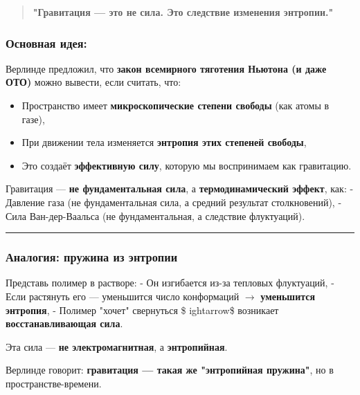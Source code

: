 \documentclass[11pt]{article}
\providecommand{\tightlist}{%
      \setlength{\itemsep}{0pt}\setlength{\parskip}{0pt}}
\begin{document}
\begin{quote}
\textbf{"Гравитация --- это не сила. Это следствие изменения энтропии."}
\end{quote}

\subsubsection{Основная
идея:}\label{ux43eux441ux43dux43eux432ux43dux430ux44f-ux438ux434ux435ux44f-1}

Верлинде предложил, что \textbf{закон всемирного тяготения Ньютона (и
даже ОТО)} можно вывести, если считать, что:

\begin{itemize}
\tightlist
\item
  Пространство имеет \textbf{микроскопические степени свободы} (как
  атомы в газе),
\item
  При движении тела изменяется \textbf{энтропия этих степеней свободы},
\item
  Это создаёт \textbf{эффективную силу}, которую мы воспринимаем как
  гравитацию.
\end{itemize}

Гравитация --- \textbf{не фундаментальная сила}, а
\textbf{термодинамический эффект}, как: - Давление газа (не
фундаментальная сила, а средний результат столкновений), - Сила
Ван-дер-Ваальса (не фундаментальная, а следствие флуктуаций).

\begin{center}\rule{0.5\linewidth}{\linethickness}\end{center}

\subsubsection{Аналогия: пружина из
энтропии}\label{ux430ux43dux430ux43bux43eux433ux438ux44f-ux43fux440ux443ux436ux438ux43dux430-ux438ux437-ux44dux43dux442ux440ux43eux43fux438ux438}

Представь полимер в растворе: - Он изгибается из-за тепловых флуктуаций,
- Если растянуть его --- уменьшится число конформаций $\rightarrow$
\textbf{уменьшится энтропия}, - Полимер "хочет" свернуться \$
ightarrow\$ возникает \textbf{восстанавливающая сила}.

Эта сила --- \textbf{не электромагнитная}, а \textbf{энтропийная}.

Верлинде говорит: \textbf{гравитация --- такая же "энтропийная
пружина"}, но в пространстве-времени.
\end{document}
